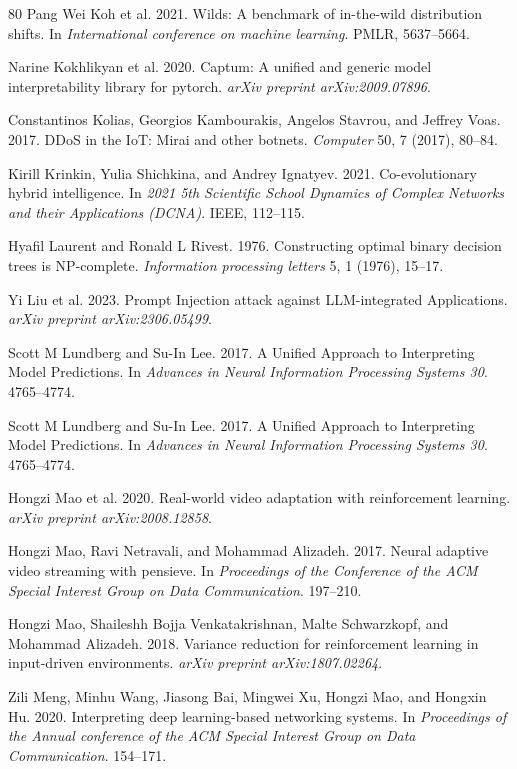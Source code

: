 \documentclass[11pt,a4paper]{article}
\begin{document}
\begin{thebibliography}{80}
 Pang Wei Koh et al. 2021. Wilds: A benchmark of in-the-wild distribution shifts. In \emph{International conference on machine learning}. PMLR, 5637--5664.

 Narine Kokhlikyan et al. 2020. Captum: A unified and generic model interpretability library for pytorch. \emph{arXiv preprint arXiv:2009.07896}.

 Constantinos Kolias, Georgios Kambourakis, Angelos Stavrou, and Jeffrey Voas. 2017. DDoS in the IoT: Mirai and other botnets. \emph{Computer} 50, 7 (2017), 80--84.

 Kirill Krinkin, Yulia Shichkina, and Andrey Ignatyev. 2021. Co-evolutionary hybrid intelligence. In \emph{2021 5th Scientific School Dynamics of Complex Networks and their Applications (DCNA)}. IEEE, 112--115.

 Hyafil Laurent and Ronald L Rivest. 1976. Constructing optimal binary decision trees is NP-complete. \emph{Information processing letters} 5, 1 (1976), 15--17.

 Yi Liu et al. 2023. Prompt Injection attack against LLM-integrated Applications. \emph{arXiv preprint arXiv:2306.05499}.

 Scott M Lundberg and Su-In Lee. 2017. A Unified Approach to Interpreting Model Predictions. In \emph{Advances in Neural Information Processing Systems 30}. 4765--4774.

 Scott M Lundberg and Su-In Lee. 2017. A Unified Approach to Interpreting Model Predictions. In \emph{Advances in Neural Information Processing Systems 30}. 4765--4774.

 Hongzi Mao et al. 2020. Real-world video adaptation with reinforcement learning. \emph{arXiv preprint arXiv:2008.12858}.

 Hongzi Mao, Ravi Netravali, and Mohammad Alizadeh. 2017. Neural adaptive video streaming with pensieve. In \emph{Proceedings of the Conference of the ACM Special Interest Group on Data Communication}. 197--210.

 Hongzi Mao, Shaileshh Bojja Venkatakrishnan, Malte Schwarzkopf, and Mohammad Alizadeh. 2018. Variance reduction for reinforcement learning in input-driven environments. \emph{arXiv preprint arXiv:1807.02264}.

 Zili Meng, Minhu Wang, Jiasong Bai, Mingwei Xu, Hongzi Mao, and Hongxin Hu. 2020. Interpreting deep learning-based networking systems. In \emph{Proceedings of the Annual conference of the ACM Special Interest Group on Data Communication}. 154--171.


\end{thebibliography}
\end{document}
